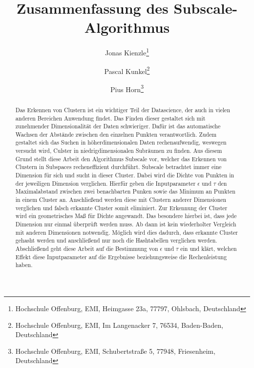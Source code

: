 \documentclass[utf8,biblatex]{lni}
\begin{document}
\title[Subscale]{Zusammenfassung des Subscale-Algorithmus}
\author[Jonas Kienzle, Pascal Kunkel \and Pius Horn]
{Jonas Kienzle\footnote{Hochschule Offenburg, EMI, Heimgasse 23a, 77797, Ohlsbach, Deutschland } \and
 Pascal Kunkel\footnote{Hochschule Offenburg, EMI, Im Langenacker 7, 76534, Baden-Baden, Deutschland } \and
Pius Horn\footnote{Hochschule Offenburg, EMI, Schubertstraße 5, 77948, Friesenheim, Deutschland }}
\maketitle

\begin{abstract}
Das Erkennen von Clustern ist ein wichtiger Teil der Datascience, der auch in vielen anderen Bereichen Anwendung findet.
Das Finden dieser gestaltet sich mit zunehmender Dimensionalität der Daten schwieriger.
Dafür ist das automatische Wachsen der Abstände zwischen den einzelnen Punkten verantwortlich.
Zudem gestaltet sich das Suchen in höherdimensionalen Daten rechenaufwendig, weswegen versucht wird, Culster in niedrigdimensionalen Subräumen zu finden.
Aus diesem Grund stellt diese Arbeit den Algorithmus Subscale vor, welcher das Erkennen von Clustern in Subspaces recheneffizient durchführt.
Subscale betrachtet immer eine Dimension für sich und sucht in dieser Cluster. 
Dabei wird die Dichte von Punkten in der jeweiligen Dimension verglichen.
Hierfür geben die Inputparameter $\epsilon$ und $\tau$ den Maximalabstand zwischen zwei benachbarten Punken sowie das Minimum an Punkten in einem Cluster an.
Anschließend werden diese mit Clustern anderer Dimensionen verglichen und falsch erkannte Cluster somit eliminiert.
Zur Erkennung der Cluster wird ein geometrisches Maß für Dichte angewandt. 
Das besondere hierbei ist, dass jede Dimension nur einmal überprüft werden muss.
Ab dann ist kein wiederholter Vergleich mit anderen Dimensionen notwendig.
Möglich wird dies dadurch, dass erkannte Cluster gehasht werden und anschließend nur noch die Hashtabellen verglichen werden.
Abschließend geht diese Arbeit auf die Bestimmung von $\epsilon$ und $\tau$ ein und klärt, welchen Effekt diese Inputparameter auf die Ergebnisse beziehungsweise die Rechenleistung haben.

\end{abstract}
\end{document}
